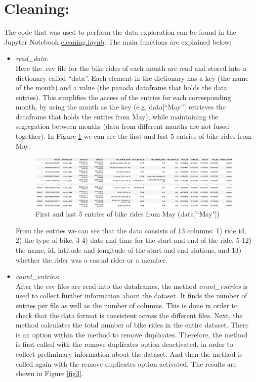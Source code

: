 \documentclass[12pt]{article}
\begin{document}
\section*{Cleaning:}
The code that was used to perform the data exploration can be found in the Jupyter Notebook \href{https://github.com/SummerKassem/BikeShareCS/blob/main/Code/cleaning.ipynb}{cleaning.ipynb}. The main functions are explained below:
\begin{itemize}
	\item \textit{read\_data}:\\
	Here the .csv file for the bike rides of each month are read and stored into a dictionary called “data”. Each element in the dictionary has a key (the name of the month) and a value (the panada dataframe that holds the data entries). This simplifies the access of the entries for each corresponding month, by using the month as the key (e.g. data[“May”] retrieves the dataframe that holds the entries from May), while maintaining the segregation between months (data from different months are not fused together). In Figure \ref{fig1} we can see the first and last 5 entries of bike rides from May:

	\begin{figure}[h]
	\hspace{-1.8cm}
	\includegraphics[width=8 in, height = 2 in]{imgMay.png}
	\caption{First and last 5 entries of bike rides from May (data[``May"])}
	\label{fig1}
	\end{figure}
	\pagebreak
	
	From the entries we can see that the data consists of 13 columns: 1) ride id, 2) the type of bike, 3-4) date and time for the start and end of the ride, 5-12) the name, id, latitude and longitude of the start and end stations, and 13) whether the rider was a casual rider or a member. 
	
	\item \textit{count\_entries}:\\
	After the csv files are read into the dataframes, the method \textit{count\_entries} is used to collect further information about the dataset. It finds the number of entries per file as well as the number of columns. This is done in order to check that the data format is consistent across the different files. Next, the method calculates the total number of bike rides in the entire dataset. There is an option within the method to remove duplicates. Therefore, the method is first called with the remove duplicates option deactivated, in order to collect preliminary information about the dataset. And then the method is called again with the remove duplicates option activated. The results are shown in Figure \ref{fig3}. 
	

\end{itemize}
\end{document}
